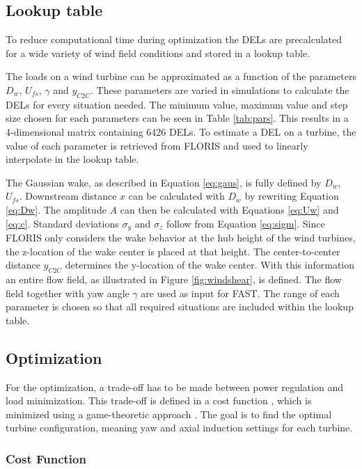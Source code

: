 \subsection{Lookup table} \label{sec:lut}
To reduce computational time during optimization the DELs are precalculated for a wide variety of wind field conditions and stored in a lookup table.

The loads on a wind turbine can be approximated as a function of the parameters $D_w$, $U_{fs}$, $\gamma$ and $y_{C2C}$. These parameters are varied in simulations to calculate the DELs for every situation needed. The minimum value, maximum value and step size chosen for each parameters can be seen in Table \ref{tab:pars}. This results in a 4-dimensional matrix containing 6426 DELs. To estimate a DEL on a turbine, the value of each parameter is retrieved from FLORIS and used to linearly interpolate in the lookup table.

The Gaussian wake, as described in Equation \ref{eq:gaus}, is fully defined by $D_w$, $U_{fs}$. Downstream distance $x$ can be calculated with $D_w$ by rewriting Equation \ref{eq:Dw}. The amplitude $A$ can then be calculated with Equations \ref{eq:Uw} and \ref{eq:c}. Standard deviations $\sigma_y$ and $\sigma_z$ follow from Equation \ref{eq:sigm}. Since FLORIS only considers the wake behavior at the hub height of the wind turbines, the z-location of the wake center is placed at that height. The center-to-center distance $y_{C2C}$ determines the y-location of the wake center. With this information an entire flow field, as illustrated in Figure \ref{fig:windshear}, is defined. The flow field together with yaw angle $\gamma$ are used as input for FAST. The range of each parameter is chosen so that all required situations are included within the lookup table.

\subsection{Optimization} \label{sec:optimization}
For the optimization, a trade-off has to be made between power regulation and load minimization. This trade-off is defined in a cost function \cite{Marden2013, Dijk2016}, which is minimized using a game-theoretic approach \cite{Marden2013}. The goal is to find the optimal turbine configuration, meaning yaw and axial induction settings for each turbine.
 

\subsubsection{Cost Function} \label{sec:costfunction}

